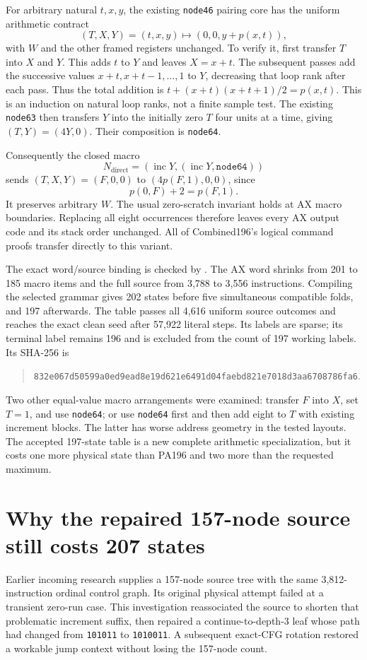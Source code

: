 \documentclass[11pt,a4paper]{article}
\begin{document}
For arbitrary natural $t,x,y$, the existing \texttt{node46} pairing core
has the uniform arithmetic contract
\[
          (T,X,Y)=(t,x,y)\longmapsto(0,0,y+p(x,t)),
\]
with $W$ and the other framed registers unchanged. To verify it, first
transfer $T$ into $X$ and $Y$. This adds $t$ to $Y$ and leaves $X=x+t$.
The subsequent passes add the successive values $x+t,x+t-1,\ldots,1$
to $Y$, decreasing that loop rank after each pass. Thus the total addition
is $t+(x+t)(x+t+1)/2=p(x,t)$. This is an induction on natural loop ranks,
not a finite sample test. The existing \texttt{node63} then transfers $Y$
into the initially zero $T$ four units at a time, giving $(T,Y)=(4Y,0)$.
Their composition is \texttt{node64}.

Consequently the closed macro
\[
        N_{\mathrm{direct}}=
          (\operatorname{inc}Y,(\operatorname{inc}Y,\texttt{node64}))
\]
sends $(T,X,Y)=(F,0,0)$ to $(4p(F,1),0,0)$, since
\[
        p(0,F)+2=p(F,1).
\]
It preserves arbitrary $W$. The usual zero-scratch invariant holds at AX
macro boundaries. Replacing all eight occurrences therefore leaves every
AX output code and its stack order unchanged. All of Combined196's logical
command proofs transfer directly to this variant.

The exact word/source binding is checked by
. The AX word shrinks from 201 to
185 macro items and the full source from 3,788 to 3,556 instructions.
Compiling the selected grammar gives 202 states before five simultaneous
compatible folds, and 197 afterwards. The table
 passes all 4,616 uniform source
outcomes and reaches the exact clean seed after 57,922 literal steps.
Its labels are sparse; its terminal label remains 196 and is excluded from
the count of 197 working labels. Its SHA-256 is
\begin{quote}\small
\nolinkurl{832e067d50599a0ed9ead8e19d621e6491d04faebd821e7018d3aa6708786fa6}.
\end{quote}
Two other equal-value macro arrangements were examined: transfer $F$ into
$X$, set $T=1$, and use \texttt{node64}; or use \texttt{node64} first and
then add eight to $T$ with existing increment blocks. The latter has worse
address geometry in the tested layouts. The accepted 197-state table is
a new complete arithmetic specialization, but it costs one more physical
state than PA196 and two more than the requested maximum.

\section{Why the repaired 157-node source still costs 207 states}
Earlier incoming research supplies a 157-node source tree with the same
3,812-instruction ordinal control graph. Its original physical attempt
failed at a transient zero-run case. This investigation reassociated the
source to shorten that problematic increment suffix, then repaired a
continue-to-depth-3 leaf whose path had changed from \texttt{101011} to
\texttt{1010011}. A subsequent exact-CFG rotation restored a workable jump
context without losing the 157-node count.
\end{document}
